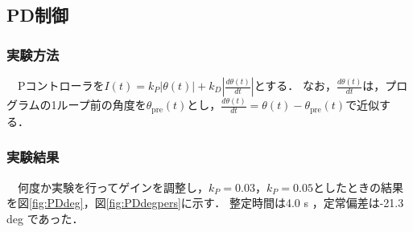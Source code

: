 \newpage

\subsection{PD制御}
\subsubsection{実験方法}
　Pコントローラを$I(t) = k_P |\theta(t)| + k_D|\frac{d\theta(t)}{dt}|$とする．
なお，$\frac{d\theta(t)}{dt}$は，プログラムの1ループ前の角度を$\theta_\mathrm{pre}(t)$とし，$\frac{d\theta(t)}{dt} = \theta(t)-\theta_\mathrm{pre}(t)$で近似する．
\subsubsection{実験結果}
　何度か実験を行ってゲインを調整し，$k_P=0.03$，$k_P=0.05$としたときの結果を図\ref{fig:PDdeg}，図\ref{fig:PDdegpers}に示す．
整定時間は4.0 s ，定常偏差は-21.3 deg であった．
